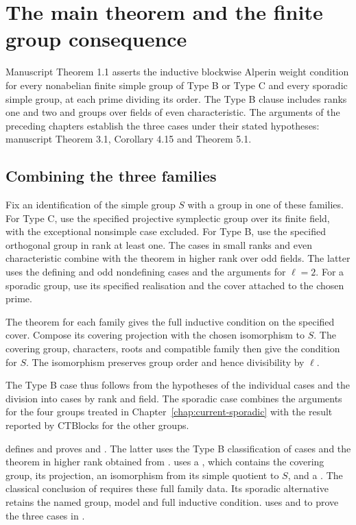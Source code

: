 \chapter{The main theorem and the finite group consequence}
\label{chap:current-main}

Manuscript Theorem 1.1 asserts the inductive blockwise Alperin weight
condition for every nonabelian finite simple group of Type B or Type C
and every sporadic simple group, at each prime dividing its order. The
Type B clause includes ranks one and two and groups over fields of even
characteristic. The arguments of the preceding chapters establish the
three cases under their stated hypotheses: manuscript Theorem 3.1,
Corollary 4.15 and Theorem 5.1.

\section{Combining the three families}

Fix an identification of the simple group $S$ with a group in one of
these families. For Type C, use the
specified projective symplectic group over its finite field, with the
exceptional nonsimple case excluded. For Type B, use the specified
orthogonal group in rank at least one. The cases in small ranks and
even characteristic combine with the theorem in higher rank over odd
fields. The latter uses the defining and odd nondefining cases and
the arguments for $\ell=2$. For a sporadic group, use its specified realisation and the cover
attached to the chosen prime.

The theorem for each family gives the full inductive condition on the
specified cover. Compose its covering projection with the chosen
isomorphism to $S$. The covering group, characters, roots and compatible
family then give the condition for $S$. The isomorphism preserves group
order and hence divisibility by $\ell$.

The Type B case thus follows from the hypotheses of the individual
cases and the division into cases by rank and field. The sporadic case combines the
arguments for the four groups treated in Chapter~\ref{chap:current-sporadic}
with the result reported by CTBlocks for the other groups.

\begin{implementation}
 defines
 and proves
 and .
The latter uses the Type B classification of cases and the theorem
in higher rank obtained from .
 uses a , which
contains the covering group, its projection, an isomorphism from its simple quotient to $S$, and a . The classical conclusion of
 requires these full family data. Its sporadic
alternative retains the named group, model and full inductive condition.
 uses
 and 
to prove the three cases in .
\end{implementation}

